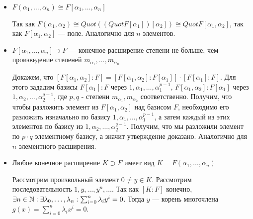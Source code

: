 \begin{itemize}
    \item[а)] $F(\alpha_1, \ldots, \alpha_n) \cong F[\alpha_1, \ldots, \alpha_n]$
    
    \par \Proof Так как $F(\alpha_1, \alpha_2) \cong Quot ((Quot F[\alpha_1])[\alpha_2]) \cong Quot F[\alpha_1, \alpha_2]$, так как $F[\alpha_1, \alpha_2]$ — поле. Аналогично для $n$ элементов. \EndProof
    
    \item[б)] $F[\alpha_1, \ldots, \alpha_n] \supset F$ — конечное расширение степени не больше, чем произведение степеней $m_{\alpha_1}, \ldots, m_{\alpha_n}$
    
    \par \Proof Докажем, что $[F[\alpha_1, \alpha_2]:F]=[F[\alpha_1, \alpha_2]:F[\alpha_1]] \cdot [F[\alpha_1]:F]$. Для этого зададим базисы $F[\alpha_1]:F$ через $1, \alpha_1, \ldots, \alpha_1^{p-1}$, $F[\alpha_1, \alpha_2]:F[\alpha_1]$ через $1, \alpha_2, \ldots, \alpha_2^{q-1}$, где $p,q$ - степени $m_{\alpha_1}, m_{\alpha_2}$ соответственно. Получим, что чтобы разложить элемент из $F[\alpha_1, \alpha_2]$ над базисом $F$, необходимо его разложить изначально по базису $1, \alpha_1, \ldots, \alpha_1^{p-1}$, а затем каждый из этих элементов по базису из $1, \alpha_2, \ldots, \alpha_2^{q-1}$. Получим, что мы разложили элемент по $p \cdot q$ элементному базису, а значит утверждение доказано. Аналогично для $n$ элементного расширения. \EndProof
    
    \item[в)] Любое конечное расширение $K \supset F$ имеет вид $K=F(\alpha_1, \ldots, \alpha_n)$
    
    \par \Proof Рассмотрим произвольный элемент $0 \neq y \in K$. Рассмотрим последовательность $1, y, \ldots, y^n, \ldots$. Так как $[K:F]$ конечно, $\exists n \in \mathbb{N}: \exists \lambda_0, \ldots, \lambda_n: \sum_{i=0}^{n} \lambda_i y^i = 0$. Тогда $y$ — корень многочлена $g(x)=\sum_{i=0}^n \lambda_i x^i = 0$. \EndProof
\end{itemize}